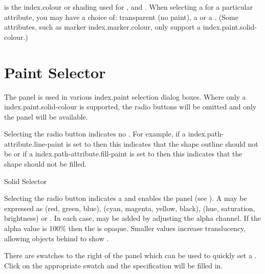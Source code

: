  is the \gls{index.colour} or \gls{shading} used for
,  and . When selecting a
 for a particular attribute, you may have a choice of:
transparent (no paint), a  or a .
(Some attributes, such as marker \gls{index.marker.colour},
only support a \gls{index.paint.solid-colour}.)

\section{Paint Selector}\label{sec:paint}


The  panel is used in various \gls{index.paint}
selection dialog boxes. Where only a \gls{index.paint.solid-colour} 
is supported, the radio buttons will be omitted and only the 
 panel will be available.


Selecting the  radio button indicates no
. For example, if a \gls{index.path-attribute.line-paint} is set to
 then this indicates that the \gls{shape}
outline should not be  or if a
\gls{index.path-attribute.fill-paint} is set to  then
this indicates that the \gls{shape} should not be filled.


{}
{Solid  Selector}

Selecting the  radio button indicates a
  and enables the
 panel (see ).  A
 may be expressed as
 (red, green, blue),
 (cyan, magenta, yellow, black),
 (hue, saturation, brightness) or
. In each case,
 may be added by adjusting
the alpha channel.  If the alpha value is 100\% then the
 is opaque.  Smaller values increase
\gls{translucency}, allowing \glspl{object} behind to show
.

There are swatches to the right of the  panel 
which can be used to quickly set a . Click on the 
appropriate swatch and the  specification will be
filled in.


